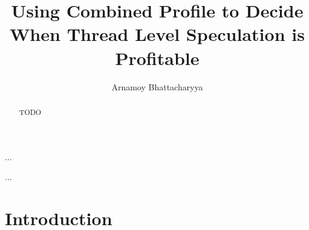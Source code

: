 \documentclass[10pt]{report}          %
\title{Using Combined Profile to Decide When Thread Level Speculation is Profitable}
\author{Arnamoy Bhattacharyya}
\begin{document}
\admin %


\begin{abstract}
TODO
\end{abstract}


\doublespacing
\begin{acknowledgements} %
%
\end{acknowledgements}

\singlespacing
\tableofcontents
\listoftables  %
\listoffigures %
\begin{listofplates}
...            %
\end{listofplates}
\begin{listofsymbols}
...            %
\end{listofsymbols}
\doublespacing %
\bodyoftext

\chapter{Introduction}
\end{document}
